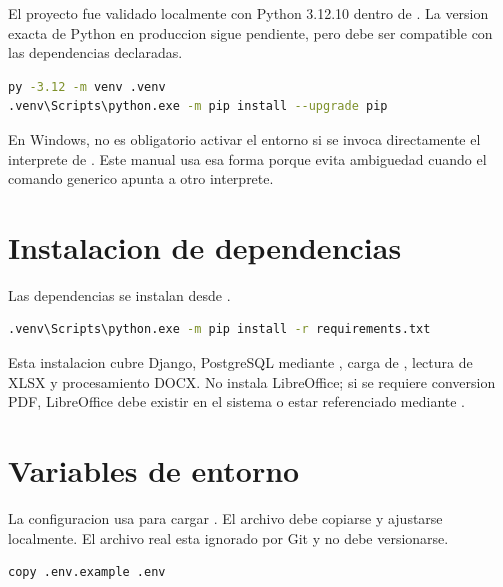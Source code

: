 El proyecto fue validado localmente con Python 3.12.10 dentro de . La version exacta de Python en produccion sigue pendiente, pero debe ser compatible con las dependencias declaradas.

\begin{lstlisting}[language=bash,caption={Creacion de entorno virtual},label={lst:instalacion-venv}]
py -3.12 -m venv .venv
.venv\Scripts\python.exe -m pip install --upgrade pip
\end{lstlisting}

En Windows, no es obligatorio activar el entorno si se invoca directamente el interprete de . Este manual usa esa forma porque evita ambiguedad cuando el comando generico  apunta a otro interprete.

\section{Instalacion de dependencias}
\label{sec:instalacion-dependencias}

Las dependencias se instalan desde .

\begin{lstlisting}[language=bash,caption={Instalacion de dependencias del proyecto},label={lst:instalacion-dependencias}]
.venv\Scripts\python.exe -m pip install -r requirements.txt
\end{lstlisting}

Esta instalacion cubre Django, PostgreSQL mediante , carga de , lectura de XLSX y procesamiento DOCX. No instala LibreOffice; si se requiere conversion PDF, LibreOffice debe existir en el sistema o estar referenciado mediante .

\section{Variables de entorno}
\label{sec:instalacion-variables}

La configuracion usa  para cargar . El archivo  debe copiarse y ajustarse localmente. El archivo real  esta ignorado por Git y no debe versionarse.

\begin{lstlisting}[language=bash,caption={Preparacion del archivo de entorno},label={lst:instalacion-env}]
copy .env.example .env
\end{lstlisting}

